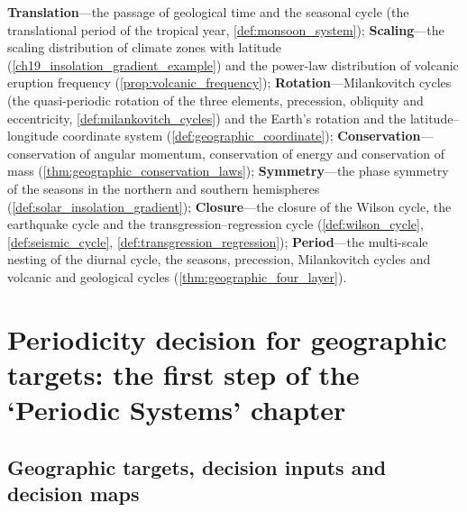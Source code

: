 \begin{remark}\label{rem:geo_seven_themes}
\textbf{Translation}---the passage of geological time and the seasonal cycle (the translational period of the tropical year, \cref{def:monsoon_system});
\textbf{Scaling}---the scaling distribution of climate zones with latitude (\cref{ch19_insolation_gradient_example}) and the power-law distribution of volcanic eruption frequency (\cref{prop:volcanic_frequency});
\textbf{Rotation}---Milankovitch cycles (the quasi-periodic rotation of the three elements, precession, obliquity and eccentricity, \cref{def:milankovitch_cycles}) and the Earth's rotation and the latitude--longitude coordinate system (\cref{def:geographic_coordinate});
\textbf{Conservation}---conservation of angular momentum, conservation of energy and conservation of mass (\cref{thm:geographic_conservation_laws});
\textbf{Symmetry}---the phase symmetry of the seasons in the northern and southern hemispheres (\cref{def:solar_insolation_gradient});
\textbf{Closure}---the closure of the Wilson cycle, the earthquake cycle and the transgression--regression cycle (\cref{def:wilson_cycle}, \cref{def:seismic_cycle}, \cref{def:transgression_regression});
\textbf{Period}---the multi-scale nesting of the diurnal cycle, the seasons, precession, Milankovitch cycles and volcanic and geological cycles (\cref{thm:geographic_four_layer}).
\end{remark}

\section{Periodicity decision for geographic targets: the first step of the `Periodic Systems' chapter}
\label{sec:geo_periodicity_decision}

\subsection{Geographic targets, decision inputs and decision maps}

